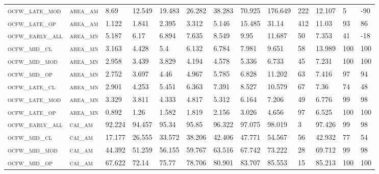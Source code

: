 \begin{landscape}
\begin{center}
\begin{footnotesize}
\begin{longtable}{lllllllllllll}
\textsc{ocfw\_late\_mod } & \textsc{area\_am  }   & 8.69     & 12.549   & 19.483   & 26.282   & 38.283   & 70.925   & 176.649  & 222 & 12.107   & 5   & -90  \\
\textsc{ocfw\_late\_op  } & \textsc{area\_am  }   & 1.122    & 1.841    & 2.395    & 3.312    & 5.146    & 15.485   & 31.14    & 412 & 11.03    & 93  & 86   \\
\textsc{ocfw\_early\_all} & \textsc{area\_mn  }   & 5.187    & 6.17     & 6.894    & 7.635    & 8.549    & 9.95     & 11.687   & 50  & 7.353    & 41  & -18  \\
\textsc{ocfw\_mid\_cl   } & \textsc{area\_mn  }   & 3.163    & 4.428    & 5.4      & 6.132    & 6.784    & 7.981    & 9.651    & 58  & 13.989   & 100 & 100  \\
\textsc{ocfw\_mid\_mod  } & \textsc{area\_mn  }   & 2.958    & 3.439    & 3.829    & 4.194    & 4.578    & 5.336    & 6.733    & 45  & 7.231    & 100 & 100  \\
\textsc{ocfw\_mid\_op   } & \textsc{area\_mn  }   & 2.752    & 3.697    & 4.46     & 4.967    & 5.785    & 6.828    & 11.202   & 63  & 7.416    & 97  & 94   \\
\textsc{ocfw\_late\_cl  } & \textsc{area\_mn  }   & 2.901    & 4.253    & 5.451    & 6.363    & 7.391    & 8.527    & 10.579   & 67  & 7.36     & 74  & 48   \\
\textsc{ocfw\_late\_mod } & \textsc{area\_mn  }   & 3.329    & 3.811    & 4.333    & 4.817    & 5.312    & 6.164    & 7.206    & 49  & 6.776    & 99  & 98   \\
\textsc{ocfw\_late\_op  } & \textsc{area\_mn  }   & 0.892    & 1.26     & 1.582    & 1.819    & 2.156    & 3.026    & 4.656    & 97  & 6.525    & 100 & 100  \\
\textsc{ocfw\_early\_all} & \textsc{cai\_am   }   & 92.224   & 94.457   & 95.34    & 95.85    & 96.322   & 97.075   & 98.019   & 3   & 97.426   & 99  & 98   \\
\textsc{ocfw\_mid\_cl   } & \textsc{cai\_am   }   & 17.177   & 26.555   & 33.572   & 38.206   & 42.406   & 47.771   & 54.567   & 56  & 42.932   & 77  & 54   \\
\textsc{ocfw\_mid\_mod  } & \textsc{cai\_am   }   & 44.392   & 51.259   & 56.155   & 59.767   & 63.516   & 67.742   & 73.222   & 28  & 69.712   & 99  & 98   \\
\textsc{ocfw\_mid\_op   } & \textsc{cai\_am   }   & 67.622   & 72.14    & 75.77    & 78.706   & 80.901   & 83.707   & 85.553   & 15  & 85.213   & 100 & 100  \\

\end{longtable}
\end{footnotesize}
\end{center}
\end{landscape}
